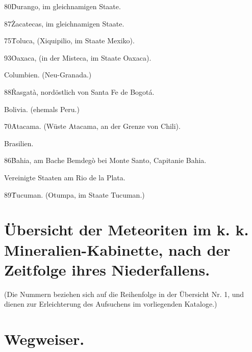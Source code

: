 \documentclass[a4paper, 11pt, oneside, polutonikogreek, german]{article}
\begin{document}
80\. Durango, im gleichnamigen Staate.

87\. Zacatecas, im gleichnamigen Staate.

75\. Toluca, (Xiquipilio, im Staate Mexiko).

93\. Oaxaca, (in der Misteca, im Staate Oaxaca).

Columbien. (Neu-Granada.)

88\. Rasgatà, nordöstlich von Santa Fe de Bogotá.

Bolivia. (ehemals Peru.)

70\. Atacama. (Wüste Atacama, an der Grenze von Chili).

Brasilien.

86\. Bahia, am Bache Bemdegò bei Monte Santo, Capitanie Bahia.

Vereinigte Staaten am Rio de la Plata.

89\. Tucuman. (Otumpa, im Staate Tucuman.)

\section{Übersicht der Meteoriten im k. k. Mineralien-Kabinette, nach der Zeitfolge ihres Niederfallens.}

(Die Nummern beziehen sich auf die Reihenfolge in der Übersicht Nr. 1, und dienen zur Erleichterung des Aufsuchens im vorliegenden Kataloge.)

 
\clearpage
\section{Wegweiser.}
\end{document}
